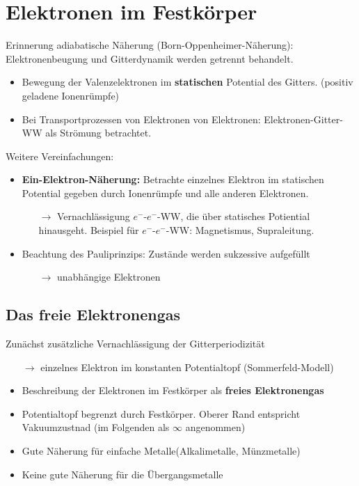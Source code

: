 \section{Elektronen im Festkörper} \label{kap:5}

Erinnerung adiabatische Näherung (Born-Oppenheimer-Näherung):\\
Elektronenbeugung und Gitterdynamik werden getrennt behandelt.
\begin{itemize}
    \item Bewegung der Valenzelektronen im \textbf{statischen} Potential des Gitters. (positiv geladene Ionenrümpfe)
    \item Bei Transportprozessen von Elektronen von Elektronen:
    Elektronen-Gitter-WW als Strömung betrachtet.
\end{itemize}

Weitere Vereinfachungen:
\begin{itemize}
    \item \textbf{Ein-Elektron-Näherung:} Betrachte einzelnes Elektron im statischen Potential gegeben durch Ionenrümpfe und alle anderen Elektronen.
    \begin{itemize}
        \item[$\rightarrow$] Vernachlässigung $e^-$-$e^-$-WW, die über statisches Potiential hinausgeht. Beispiel für $e^-$-$e^-$-WW: Magnetismus, Supraleitung.
    \end{itemize}
    \item Beachtung des Pauliprinzips: Zustände werden sukzessive aufgefüllt
    \begin{itemize}
        \item[$\rightarrow$] unabhängige Elektronen  
    \end{itemize}    
\end{itemize}

\subsection{Das freie Elektronengas} \label{kap:5_1}
Zunächst zusätzliche Vernachlässigung der Gitterperiodizität
\begin{itemize}
    \item[$\rightarrow$] einzelnes Elektron im konstanten Potentialtopf (Sommerfeld-Modell)
    \begin{figure}[H]
        \centering
        
        \label{5_1Graph}
    \end{figure}
    \item Beschreibung der Elektronen im Festkörper als \textbf{freies Elektronengas}
    \item Potentialtopf begrenzt durch Festkörper. Oberer Rand entspricht Vakuumzustnad (im Folgenden als $\infty$ angenommen)
    \item Gute Näherung für \glqq einfache Metalle\grqq (Alkalimetalle, Münzmetalle)
    \item Keine gute Näherung für die Übergangsmetalle
\end{itemize}

